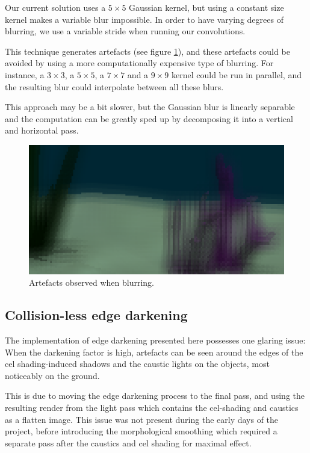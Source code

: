 \documentclass{article}
\begin{document}
Our current solution uses a $5\times5$ Gaussian kernel, but using a constant size kernel makes a variable blur 
impossible. In order to have varying degrees of blurring, we use a variable stride 
when running our convolutions. 

\medskip \par
\noindent
This technique generates artefacts (see figure \ref{fig:blur_artefacts}), and these artefacts could be avoided 
by using a more computationally expensive type of blurring. 
For instance, a $3\times3$, a $5\times5$, a $7\times7$ and a $9\times9$ kernel could be run in parallel, 
and the resulting blur could interpolate between all these blurs. 

\medskip \par
\noindent
This approach may be a bit slower, but the Gaussian blur is linearly separable and the computation can be greatly 
sped up by decomposing it into a vertical and horizontal pass.

\begin{figure}[h]
	\centering
	\includegraphics[width=0.8\columnwidth]{imgs/blur_artefacts.png}
	\hspace{1em}
	\caption{Artefacts observed when blurring.}
	\label{fig:blur_artefacts}
\end{figure}

\newpage
\subsection{Collision-less edge darkening} 

The implementation of edge darkening presented here possesses one glaring issue: When the darkening factor is high,
artefacts can be seen around the edges of the cel shading-induced shadows and the caustic lights on the objects, 
most noticeably on the ground.

\medskip \par
\noindent
This is due to moving the edge darkening process to the final pass, and using the resulting render from the light
pass which contains the cel-shading and caustics as a flatten image. This issue was not present during the early 
days of the project, before introducing the morphological smoothing which required a separate pass after the caustics
and cel shading for maximal effect. 
\end{document}
